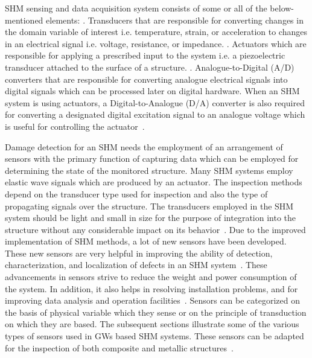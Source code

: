 \documentclass[b5paper, 11pt, titlepage]{book}
\begin{document}
SHM sensing and data acquisition system consists of some or all of the below-mentioned elements:
. Transducers that are responsible for converting changes in the domain variable of interest i.e. temperature, strain, or acceleration to changes in an electrical signal i.e. voltage, resistance, or impedance.
. Actuators which are responsible for applying a prescribed input to the system i.e. a piezoelectric transducer attached to the surface of a structure.
. Analogue-to-Digital (A/D) converters that are responsible for converting analogue electrical signals into digital signals which can be processed later on digital hardware. When an SHM system is using actuators, a Digital-to-Analogue (D/A) converter is also required for converting a designated digital excitation signal to an analogue voltage which is useful for controlling the actuator~\cite{TibaduizaBurgos2020, Farrar2012}. 

Damage detection for an SHM needs the employment of an arrangement of sensors with the primary function of capturing data which can be employed for determining the state of the monitored structure. Many SHM systems employ elastic wave signals which are produced by an actuator. The inspection methods depend on the transducer type used for inspection and also the type of propagating signals over the structure. The transducers employed in the SHM system should be light and small in size for the purpose of integration into the structure without any considerable impact on its behavior~\cite{stepinski2013advanced}. Due to the improved implementation of SHM methods, a lot of new sensors have been developed. These new sensors are very helpful in improving the ability of detection, characterization, and localization of defects in an SHM system~\cite{Das2018}. These advancements in sensors strive to reduce the weight and power consumption of the system. In addition, it also helps in resolving installation problems, and for improving data analysis and operation facilities~\cite{TibaduizaBurgos2020}. Sensors can be categorized on the basis of physical variable which they sense or on the principle of transduction on which they are based. The subsequent sections illustrate some of the various types of sensors used in GWs based SHM systems. These sensors can be adapted for the inspection of both composite and metallic structures~\cite{Farrar2012,TibaduizaBurgos2020, Mitra2016}.
\end{document}
